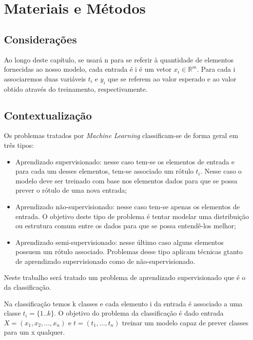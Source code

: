 \chapter{Materiais e Métodos}

\section{Considerações}
\label{sec:considerations}

Ao longo deste capítulo, se usará n para se referir à quantidade de elementos
fornecidas ao nosso modelo, cada entrada é i é um vetor $x_i \in \mathbb{R}^m$.
Para cada i associaremos duas variáveis $t_i$ e $y_i$ que se referem ao valor
esperado e ao valor obtido através do treinamento, respectivamente. 

\section{Contextualização}
\label{sec:methods}

Os problemas tratados por \textit{Machine Learning} classificam-se de forma
geral em três tipos:

\begin{itemize}
	\item Aprendizado supervisionado: nesse caso tem-se os elementos de entrada e
	para cada um desses elementos, tem-se associado um rótulo $t_i$. Nesse caso o modelo
	deve ser treinado com base nos elementos dados para que se possa prever o rótulo %
	de uma nova entrada;
	\item Aprendizado não-supervisionado: nesse caso tem-se apenas os elementos de entrada. 
	O objetivo deste tipo de problema é tentar modelar uma distribuição ou estrutura comum
	entre os dados para que se possa entendê-los melhor;
	\item Aprendizado semi-supervisionado: nesse último caso alguns elementos possuem um rótulo
	associado. Problemas desse tipo aplicam técnicas gtanto de aprendizado supervisionado como
	de não-supervisionado.
\end{itemize}

Neste trabalho será tratado um problema de aprendizado supervisionado que é o da classificação.

Na classificação temos k classes e cada elemento i da entrada é associado a uma classe $t_i = \{1..k\}$.
O objetivo do problema da classificação é dado entrada $X = (x_1, x_2, \ldots, x_n)$ 
e $t = (t_1, \ldots, t_n)$ treinar um modelo capaz de prever classes para um x qualquer.

